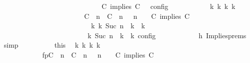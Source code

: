\begin{isabellebody}
\ \ \ \ \ \ \ \ \ \ \ \ \ \ \ \ \ \ \ \ \ \ \ \ \ \ {\isasymturnstile}\ {\isasymPsi}\ {\isasymtriangleright}\ {\isacharparenleft}{\isacharparenleft}C\ implies\ C\ {\isacharhash}\ {\isasymPhi}{\isacharparenright}\ {\isasymrbrakk}\isactrlsub c\isactrlsub o\isactrlsub n\isactrlsub f\isactrlsub i\isactrlsub g{\isacartoucheclose}\isanewline
\ \ \ \ \ \ \ \ \isamarkupfalse%
\ \isamarkupfalse%
\ {\isacartoucheopen}{\isasymexists}{\isasymGamma}\isactrlsub k\ {\isasymPsi}\isactrlsub k\ {\isasymPhi}\isactrlsub k\ k{\isachardot}\ {\isacharparenleft}\isanewline
\ \ \ \ \ \ \ \ \ \ \ \ \ \ \ \ \ \ \ \ \ \ \ \ {\isacharparenleft}{\isacharparenleft}{\isacharparenleft}C\ {\isasymUp}\ n{\isacharparenright}\ {\isacharhash}\ {\isacharparenleft}C\ {\isasymUp}\ n{\isacharparenright}\ {\isacharhash}\ {\isasymGamma}{\isacharparenright}{\isacharcomma}\ n\ {\isasymturnstile}\ {\isasymPsi}\ {\isasymtriangleright}\ {\isacharparenleft}{\isacharparenleft}C\ implies\ C\ {\isacharhash}\ {\isasymPhi}{\isacharparenright}{\isacharparenright}\isanewline
\ \ \ \ \ \ \ \ \ \ \ \ \ \ \ \ \ \ \ \ \ \ \ \ \ \ {\isasymhookrightarrow}\isactrlbsup k\isactrlesup \ {\isacharparenleft}{\isasymGamma}\isactrlsub k{\isacharcomma}\ Suc\ n\ {\isasymturnstile}\ {\isasymPsi}\isactrlsub k\ {\isasymtriangleright}\ {\isasymPhi}\isactrlsub k{\isacharparenright}\isanewline
\ \ \ \ \ \ \ \ \ \ \ \ \ \ \ \ \ \ \ \ {\isacharparenright}\ {\isasymand}\ {\isasymrho}\ {\isasymin}\ {\isasymlbrakk}\ {\isasymGamma}\isactrlsub k{\isacharcomma}\ Suc\ n\ {\isasymturnstile}\ {\isasymPsi}\isactrlsub k\ {\isasymtriangleright}\ {\isasymPhi}\isactrlsub k\ {\isasymrbrakk}\isactrlsub c\isactrlsub o\isactrlsub n\isactrlsub f\isactrlsub i\isactrlsub g{\isacartoucheclose}\isanewline
\ \ \ \ \ \ \ \ \ \ \isamarkupfalse%
\ h{}\ Implies{\isachardot}prems\ \isamarkupfalse%
\ simp\isanewline
\ \ \ \ \ \ \ \ \isamarkupfalse%
\ this\ \isamarkupfalse%
\ {\isasymGamma}\isactrlsub k\ {\isasymPsi}\isactrlsub k\ {\isasymPhi}\isactrlsub k\ k\ \isanewline
\ \ \ \ \ \ \ \ \ \ \ \ fp{\isacharcolon}{\isacartoucheopen}{\isacharparenleft}{\isacharparenleft}{\isacharparenleft}C\ {\isasymUp}\ n{\isacharparenright}\ {\isacharhash}\ {\isacharparenleft}C\ {\isasymUp}\ n{\isacharparenright}\ {\isacharhash}\ {\isasymGamma}{\isacharparenright}{\isacharcomma}\ n\ {\isasymturnstile}\ {\isasymPsi}\ {\isasymtriangleright}\ {\isacharparenleft}{\isacharparenleft}C\ implies\ C\ {\isacharhash}\ {\isasymPhi}{\isacharparenright}{\isacharparenright}\isanewline

\end{isabellebody}
